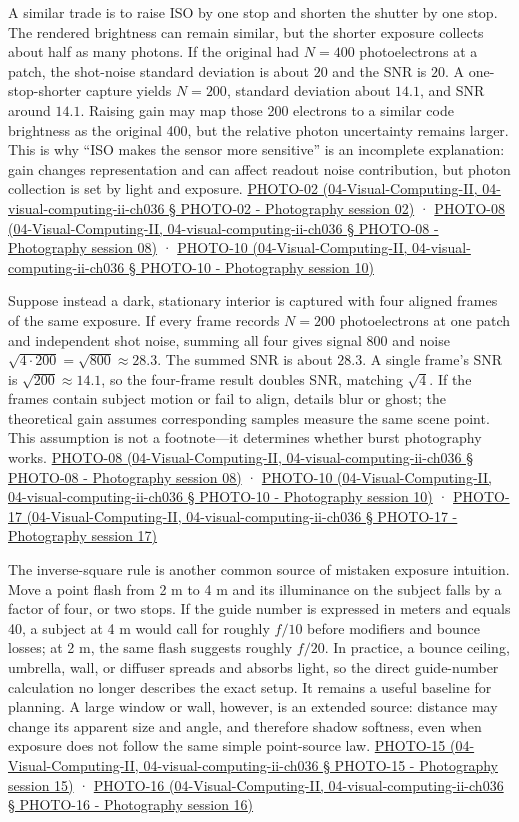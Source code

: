 A similar trade is to raise ISO by one stop and shorten the shutter by one stop. The rendered brightness can remain similar, but the shorter exposure collects about half as many photons. If the original had \(N=400\) photoelectrons at a patch, the shot-noise standard deviation is about \(20\) and the SNR is \(20\). A one-stop-shorter capture yields \(N=200\), standard deviation about \(14.1\), and SNR around \(14.1\). Raising gain may map those 200 electrons to a similar code brightness as the original 400, but the relative photon uncertainty remains larger. This is why ``ISO makes the sensor more sensitive'' is an incomplete explanation: gain changes representation and can affect readout noise contribution, but photon collection is set by light and exposure. \href{}{PHOTO-02 (04-Visual-Computing-II, 04-visual-computing-ii-ch036 § PHOTO-02 - Photography session 02)} · \href{}{PHOTO-08 (04-Visual-Computing-II, 04-visual-computing-ii-ch036 § PHOTO-08 - Photography session 08)} · \href{}{PHOTO-10 (04-Visual-Computing-II, 04-visual-computing-ii-ch036 § PHOTO-10 - Photography session 10)}

Suppose instead a dark, stationary interior is captured with four aligned frames of the same exposure. If every frame records \(N=200\) photoelectrons at one patch and independent shot noise, summing all four gives signal \(800\) and noise \(\sqrt{4\cdot200}=\sqrt{800}\approx28.3\). The summed SNR is about \(28.3\). A single frame's SNR is \(\sqrt{200}\approx14.1\), so the four-frame result doubles SNR, matching \(\sqrt4\). If the frames contain subject motion or fail to align, details blur or ghost; the theoretical gain assumes corresponding samples measure the same scene point. This assumption is not a footnote---it determines whether burst photography works. \href{}{PHOTO-08 (04-Visual-Computing-II, 04-visual-computing-ii-ch036 § PHOTO-08 - Photography session 08)} · \href{}{PHOTO-10 (04-Visual-Computing-II, 04-visual-computing-ii-ch036 § PHOTO-10 - Photography session 10)} · \href{}{PHOTO-17 (04-Visual-Computing-II, 04-visual-computing-ii-ch036 § PHOTO-17 - Photography session 17)}

The inverse-square rule is another common source of mistaken exposure intuition. Move a point flash from 2 m to 4 m and its illuminance on the subject falls by a factor of four, or two stops. If the guide number is expressed in meters and equals 40, a subject at 4 m would call for roughly \(f/10\) before modifiers and bounce losses; at 2 m, the same flash suggests roughly \(f/20\). In practice, a bounce ceiling, umbrella, wall, or diffuser spreads and absorbs light, so the direct guide-number calculation no longer describes the exact setup. It remains a useful baseline for planning. A large window or wall, however, is an extended source: distance may change its apparent size and angle, and therefore shadow softness, even when exposure does not follow the same simple point-source law. \href{}{PHOTO-15 (04-Visual-Computing-II, 04-visual-computing-ii-ch036 § PHOTO-15 - Photography session 15)} · \href{}{PHOTO-16 (04-Visual-Computing-II, 04-visual-computing-ii-ch036 § PHOTO-16 - Photography session 16)}

